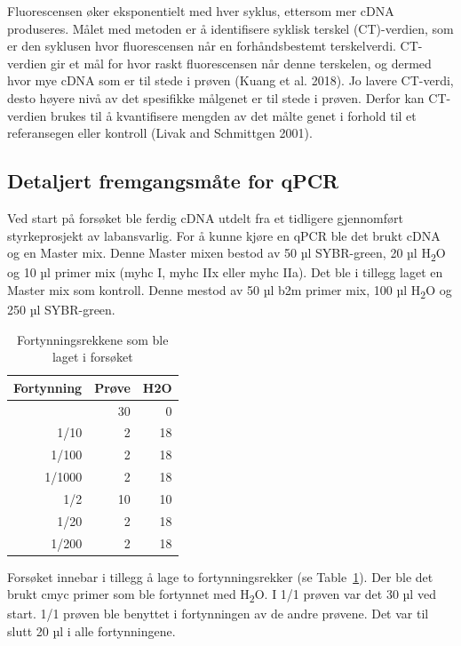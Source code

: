 \documentclass[
  letterpaper,
  DIV=11,
  numbers=noendperiod]{scrreprt}
\begin{document}
Fluorescensen øker eksponentielt med hver syklus, ettersom mer cDNA
produseres. Målet med metoden er å identifisere syklisk terskel
(CT)-verdien, som er den syklusen hvor fluorescensen når en
forhåndsbestemt terskelverdi. CT-verdien gir et mål for hvor raskt
fluorescensen når denne terskelen, og dermed hvor mye cDNA som er til
stede i prøven (Kuang et al. 2018). Jo lavere CT-verdi, desto høyere
nivå av det spesifikke målgenet er til stede i prøven. Derfor kan
CT-verdien brukes til å kvantifisere mengden av det målte genet i
forhold til et referansegen eller kontroll (Livak and Schmittgen 2001).

\subsection{Detaljert fremgangsmåte for
qPCR}\label{detaljert-fremgangsmuxe5te-for-qpcr}

Ved start på forsøket ble ferdig cDNA utdelt fra et tidligere
gjennomført styrkeprosjekt av labansvarlig. For å kunne kjøre en qPCR
ble det brukt cDNA og en Master mix. Denne Master mixen bestod av 50 µl
SYBR-green, 20 µl H\textsubscript{2}O og 10 µl primer mix (myhc I, myhc
IIx eller myhc IIa). Det ble i tillegg laget en Master mix som kontroll.
Denne mestod av 50 µl b2m primer mix, 100 µl H\textsubscript{2}O og 250
µl SYBR-green.

\begingroup
\fontsize{12.0pt}{14.4pt}\selectfont

\begin{longtable}{rrr}

\caption{\label{tbl-fortynn}Fortynningsrekkene som ble laget i forsøket}

\tabularnewline

\toprule
Fortynning & Prøve & H2O \\ 
\midrule\addlinespace[2.5pt]
1 & 30 & 0 \\ 
1/10 & 2 & 18 \\ 
1/100 & 2 & 18 \\ 
1/1000 & 2 & 18 \\ 
1/2 & 10 & 10 \\ 
1/20 & 2 & 18 \\ 
1/200 & 2 & 18 \\ 
\bottomrule

\end{longtable}

\endgroup

Forsøket innebar i tillegg å lage to fortynningsrekker (se
Table~\ref{tbl-fortynn}). Der ble det brukt cmyc primer som ble
fortynnet med H\textsubscript{2}O. I 1/1 prøven var det 30 µl ved start.
1/1 prøven ble benyttet i fortynningen av de andre prøvene. Det var til
slutt 20 µl i alle fortynningene.
\end{document}
